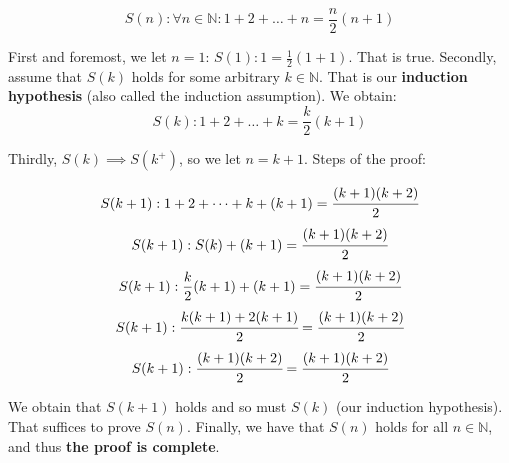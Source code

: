 \documentclass[10pt,a4paper]{article}
\begin{document}
$$S(n): \forall n \in \mathbb{N}: 1 + 2 + \dots + n = \frac{n}{2} (n + 1)$$

First and foremost, we let $n=1$: $S(1): 1 = \frac{1}{2} (1 + 1)$. That is true. \linebreak  %
Secondly, assume that $S(k)$ holds for some arbitrary $k \in \mathbb{N}$.  %
That is our \textbf{induction hypothesis} (also called the induction assumption). We obtain:
$$S(k): 1 + 2 + \dots + k = \frac{k}{2} (k + 1)$$

Thirdly, $S(k) \implies S(k^{+})$, so we let $n=k+1$. Steps of the proof:  %

$$S(k + 1): 1 + 2 + \dots + k + (k + 1) = \cfrac{(k+1)(k+2)}{2}$$  %
$$S(k + 1): S(k) + (k + 1) = \cfrac{(k+1)(k+2)}{2}$$
$$S(k + 1): \frac{k}{2} (k + 1) + (k + 1) = \cfrac{(k+1)(k+2)}{2}$$
$$S(k + 1): \cfrac{k(k+1) + 2(k+1)}{2} = \cfrac{(k+1)(k+2)}{2}$$
$$S(k + 1): \cfrac{(k+1)(k+2)}{2} = \cfrac{(k+1)(k+2)}{2}$$

We obtain that $S(k+1)$ holds and so must $S(k)$ (our induction hypothesis). That suffices to prove $S(n)$.
Finally, we have that $S(n)$ holds for all $n \in \mathbb{N}$, and thus \textbf{the proof is complete}.  %

\end{document}
